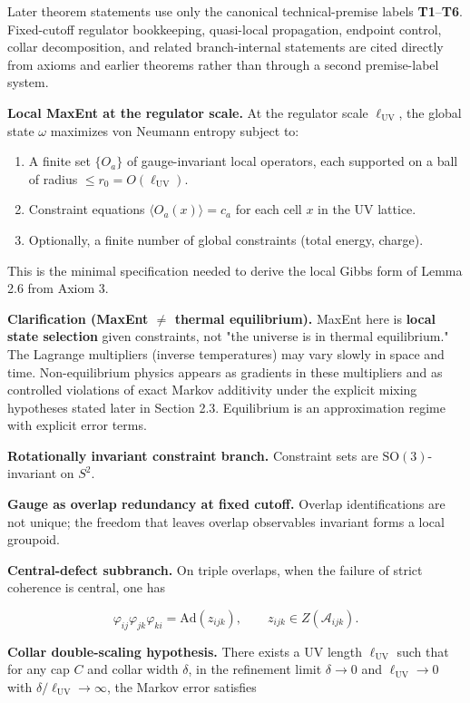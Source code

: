 Later theorem statements use only the canonical technical-premise labels \textbf{T1}--\textbf{T6}. Fixed-cutoff regulator bookkeeping, quasi-local propagation, endpoint control, collar decomposition, and related branch-internal statements are cited directly from axioms and earlier theorems rather than through a second premise-label system.

\textbf{Local MaxEnt at the regulator scale.} At the regulator scale \(\ell_{\mathrm{UV}}\), the global state \(\omega\) maximizes von Neumann entropy subject to:

\begin{enumerate}
\def\labelenumi{\arabic{enumi}.}
\tightlist
\item
  A finite set \(\{O_a\}\) of gauge-invariant local operators, each supported on a ball of radius \(\le r_0 = O(\ell_{\mathrm{UV}})\).
\item
  Constraint equations \(\langle O_a(x) \rangle = c_a\) for each cell \(x\) in the UV lattice.
\item
  Optionally, a finite number of global constraints (total energy, charge).
\end{enumerate}

This is the minimal specification needed to derive the local Gibbs form of Lemma 2.6 from Axiom 3.

\textbf{Clarification (MaxEnt \(\neq\) thermal equilibrium).} MaxEnt here is \textbf{local state selection} given constraints, not "the universe is in thermal equilibrium." The Lagrange multipliers (inverse temperatures) may vary slowly in space and time. Non-equilibrium physics appears as gradients in these multipliers and as controlled violations of exact Markov additivity under the explicit mixing hypotheses stated later in Section 2.3. Equilibrium is an approximation regime with explicit error terms.

\textbf{Rotationally invariant constraint branch.} Constraint sets are \(\mathrm{SO}(3)\)-invariant on \(S^2\).

\textbf{Gauge as overlap redundancy at fixed cutoff.} Overlap identifications are not unique; the freedom that leaves overlap observables invariant forms a local groupoid.

\textbf{Central-defect subbranch.} On triple overlaps, when the failure of strict coherence is central, one has

\[
\varphi_{ij} \varphi_{jk} \varphi_{ki} = \mathrm{Ad}(z_{ijk}),\qquad z_{ijk} \in Z(\mathcal{A}_{ijk}).
\]

\textbf{Collar double-scaling hypothesis.} There exists a UV length \(\ell_{\mathrm{UV}}\) such that for any cap \(C\) and collar width \(\delta\), in the refinement limit \(\delta \to 0\) and \(\ell_{\mathrm{UV}} \to 0\) with \(\delta/\ell_{\mathrm{UV}} \to \infty\), the Markov error satisfies

